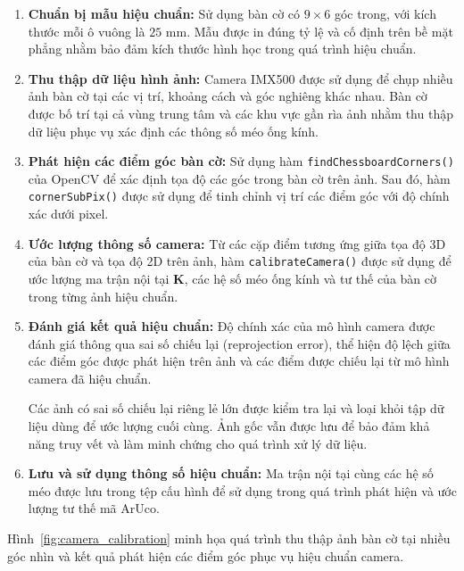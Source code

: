 \begin{enumerate}
    \item \textbf{Chuẩn bị mẫu hiệu chuẩn:}
    Sử dụng bàn cờ có $9\times6$ góc trong, với kích thước mỗi ô vuông là $25$ mm. Mẫu được in đúng tỷ lệ và cố định trên bề mặt phẳng nhằm bảo đảm kích thước hình học trong quá trình hiệu chuẩn.

    \item \textbf{Thu thập dữ liệu hình ảnh:}
    Camera IMX500 được sử dụng để chụp nhiều ảnh bàn cờ tại các vị trí, khoảng cách và góc nghiêng khác nhau. Bàn cờ được bố trí tại cả vùng trung tâm và các khu vực gần rìa ảnh nhằm thu thập dữ liệu phục vụ xác định các thông số méo ống kính.

    \item \textbf{Phát hiện các điểm góc bàn cờ:}
    Sử dụng hàm \texttt{findChessboardCorners()} của OpenCV để xác định tọa độ các góc trong bàn cờ trên ảnh. Sau đó, hàm \texttt{cornerSubPix()} được sử dụng để tinh chỉnh vị trí các điểm góc với độ chính xác dưới pixel.

    \item \textbf{Ước lượng thông số camera:}
    Từ các cặp điểm tương ứng giữa tọa độ 3D của bàn cờ và tọa độ 2D trên ảnh, hàm \texttt{calibrateCamera()} được sử dụng để ước lượng ma trận nội tại $\mathbf{K}$, các hệ số méo ống kính và tư thế của bàn cờ trong từng ảnh hiệu chuẩn.

    \item \textbf{Đánh giá kết quả hiệu chuẩn:}
    Độ chính xác của mô hình camera được đánh giá thông qua sai số chiếu lại (reprojection error), thể hiện độ lệch giữa các điểm góc được phát hiện trên ảnh và các điểm được chiếu lại từ mô hình camera đã hiệu chuẩn.

    Các ảnh có sai số chiếu lại riêng lẻ lớn được kiểm tra lại và loại khỏi tập dữ liệu dùng để ước lượng cuối cùng. Ảnh gốc vẫn được lưu để bảo đảm khả năng truy vết và làm minh chứng cho quá trình xử lý dữ liệu.

    \item \textbf{Lưu và sử dụng thông số hiệu chuẩn:}
    Ma trận nội tại cùng các hệ số méo được lưu trong tệp cấu hình để sử dụng trong quá trình phát hiện và ước lượng tư thế mã ArUco.
\end{enumerate}

Hình~\ref{fig:camera_calibration} minh họa quá trình thu thập ảnh bàn cờ tại nhiều góc nhìn và kết quả phát hiện các điểm góc phục vụ hiệu chuẩn camera.

